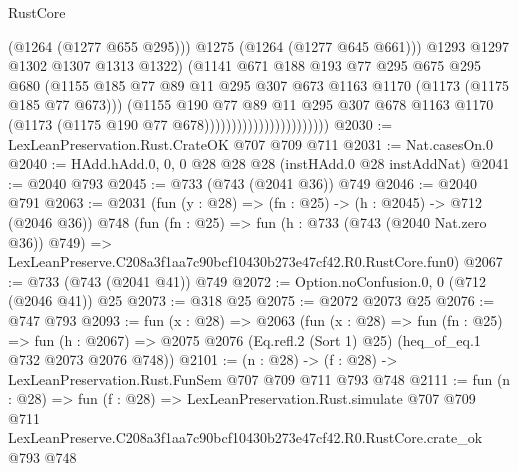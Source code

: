 \begin{lexlean}{RustCore}
\begin{coremodule}
                                                (@1264 (@1277 @655 @295)))
                                              @1275
                                              (@1264 (@1277 @645 @661)))
                                            @1293
                                            @1297
                                            @1302
                                            @1307
                                            @1313
                                            @1322)
                                          (@1141
                                            @671
                                            @188
                                            @193
                                            @77
                                            @295
                                            @675
                                            @295
                                            @680
                                            (@1155
                                              @185
                                              @77
                                              @89
                                              @11
                                              @295
                                              @307
                                              @673
                                              @1163
                                              @1170
                                              (@1173 (@1175 @185 @77 @673)))
                                            (@1155
                                              @190
                                              @77
                                              @89
                                              @11
                                              @295
                                              @307
                                              @678
                                              @1163
                                              @1170
                                              (@1173 (@1175 @190 @77 @678)))))))))))))))))))))))
@2030 := LexLeanPreservation.Rust.CrateOK @707 @709 @711
@2031 := Nat.casesOn.{0}
@2040 := HAdd.hAdd.{0, 0, 0} @28 @28 @28 (instHAdd.{0} @28 instAddNat)
@2041 := @2040 @793
@2045 := @733 (@743 (@2041 @36)) @749
@2046 := @2040 @791
@2063 := @2031
    (fun (y : @28) => (fn : @25) -> (h : @2045) -> @712 (@2046 @36))
    @748
    (fun (fn : @25) =>
    fun (h : @733 (@743 (@2040 Nat.zero @36)) @749) =>
    LexLeanPreserve.C208a3f1aa7c90bcf10430b273e47cf42.R0.RustCore.fun0)
@2067 := @733 (@743 (@2041 @41)) @749
@2072 := Option.noConfusion.{0, 0} (@712 (@2046 @41)) @25
@2073 := @318 @25
@2075 := @2072 @2073 @25
@2076 := @747 @793
@2093 := fun (x : @28) =>
  @2063
    (fun (x : @28) =>
    fun (fn : @25) =>
    fun (h : @2067) => @2075 @2076 (Eq.refl.{2} (Sort 1) @25) (heq_of_eq.{1} @732 @2073 @2076 @748))
@2101 := (n : @28) -> (f : @28) -> LexLeanPreservation.Rust.FunSem @707 @709 @711 @793 @748
@2111 := fun (n : @28) =>
  fun (f : @28) =>
  LexLeanPreservation.Rust.simulate
    @707
    @709
    @711
    LexLeanPreserve.C208a3f1aa7c90bcf10430b273e47cf42.R0.RustCore.crate_ok
    @793
    @748
\end{coremodule}
\end{lexlean}
